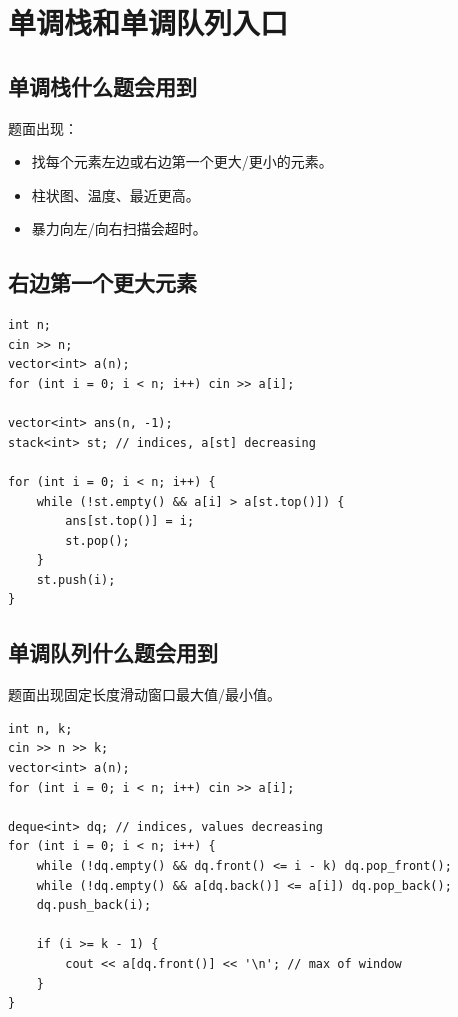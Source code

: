 \section{单调栈和单调队列入口}\label{sec:06-15}

\subsection{单调栈什么题会用到}

题面出现：

\begin{itemize}
  \item 找每个元素左边或右边第一个更大/更小的元素。
  \item 柱状图、温度、最近更高。
  \item 暴力向左/向右扫描会超时。
\end{itemize}

\subsection{右边第一个更大元素}

\begin{lstlisting}
int n;
cin >> n;
vector<int> a(n);
for (int i = 0; i < n; i++) cin >> a[i];

vector<int> ans(n, -1);
stack<int> st; // indices, a[st] decreasing

for (int i = 0; i < n; i++) {
    while (!st.empty() && a[i] > a[st.top()]) {
        ans[st.top()] = i;
        st.pop();
    }
    st.push(i);
}
\end{lstlisting}

\subsection{单调队列什么题会用到}

题面出现固定长度滑动窗口最大值/最小值。

\begin{lstlisting}
int n, k;
cin >> n >> k;
vector<int> a(n);
for (int i = 0; i < n; i++) cin >> a[i];

deque<int> dq; // indices, values decreasing
for (int i = 0; i < n; i++) {
    while (!dq.empty() && dq.front() <= i - k) dq.pop_front();
    while (!dq.empty() && a[dq.back()] <= a[i]) dq.pop_back();
    dq.push_back(i);

    if (i >= k - 1) {
        cout << a[dq.front()] << '\n'; // max of window
    }
}
\end{lstlisting}

